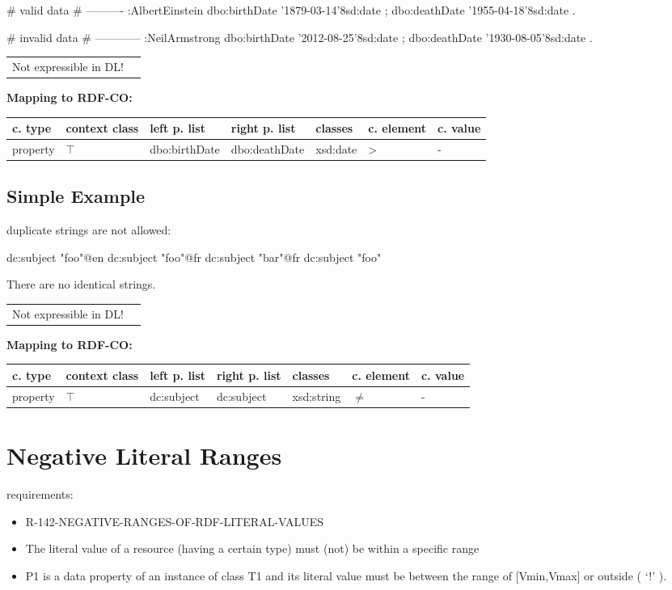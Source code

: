 \documentclass{llncs}
\newenvironment{gcotable}{
  \scriptsize
  \sffamily
  \vspace{0cm}
	\begin{center}
	\textbf{\vspace{0.4cm}Mapping to RDF-CO:} \\
  \begin{tabular}{l|l|l|l|l|l|l}
	\hline
  \textbf{c. type} & \textbf{context class} & \textbf{left p. list} & \textbf{right p. list} & \textbf{classes} & \textbf{c. element} & \textbf{c. value} \\
  \hline

}{
  \hline
  \end{tabular}
	\end{center}
}
\newenvironment{DL}{
  \vspace{0cm}
	\begin{center}
  \begin{tabular}{r l}

}{
  \end{tabular}
	\end{center}
}
\begin{document}
\begin{ex}
# valid data
# ----------
:AlbertEinstein
    dbo:birthDate '1879-03-14'^^xsd:date ;
    dbo:deathDate '1955-04-18'^^xsd:date .
\end{ex}

\begin{ex}
# invalid data
# ------------
:NeilArmstrong
    dbo:birthDate '2012-08-25'^^xsd:date ;
    dbo:deathDate '1930-08-05'^^xsd:date .
\end{ex}

\begin{DL}
Not expressible in DL!
\end{DL}

\begin{gcotable}
property & $\top$ & dbo:birthDate & dbo:deathDate & xsd:date & \textgreater & - \\
\end{gcotable}

\subsection{Simple Example}

duplicate strings are not allowed:

\begin{ex}
dc:subject "foo"@en
dc:subject "foo"@fr
dc:subject "bar"@fr
dc:subject "foo"
\end{ex}

There are no identical strings.

\begin{DL}
Not expressible in DL!
\end{DL}

\begin{gcotable}
property & $\top$ & dc:subject & dc:subject & xsd:string & $\neq$ & - \\
\end{gcotable}

\section{Negative Literal Ranges}

requirements:

\begin{itemize}
	\item R-142-NEGATIVE-RANGES-OF-RDF-LITERAL-VALUES
\end{itemize}



\begin{itemize}
	\item The literal value of a resource (having a certain type) must (not) be within a specific range
  \item P1 is a data property of an instance of class T1 and its literal value must be between the range of [Vmin,Vmax] or outside ( ‘!' ).
\end{itemize}
\end{document}
